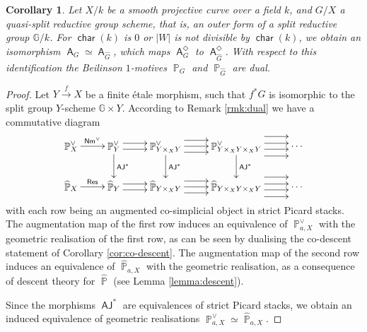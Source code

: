 \documentclass{article}
\DeclareMathOperator{\A}{\mathsf{A}}
\newcommand{\Gb}{\mathbb{G}}
\DeclareMathOperator{\Pb}{\mathbb{P}}
\DeclareMathOperator{\Res}{\mathsf{Res}}
\DeclareMathOperator{\Nm}{\mathsf{Nm}}
\DeclareMathOperator{\charac}{\mathsf{char}}
\DeclareMathOperator{\AJ}{\mathsf{AJ}}
\theoremstyle{definition}
\theoremstyle{plain}
\newtheorem{corollary}[definition]{Corollary}
\begin{document}
\begin{corollary}\label{cor:duality}
Let $X/k$ be a smooth projective curve over a field $k$, and $G/X$ a quasi-split reductive group scheme, that is, an outer form of a split reductive group $\Gb/k$. For $\charac(k)$ is $0$ or $|W|$ is not divisible by $\charac(k)$, we obtain an isomorphism $\A_{G} \simeq \A_{\widehat{G}}$, which maps $\A_{G}^{\Diamond}$ to $\A_{\widehat{G}}^{\Diamond}$. With respect to this identification the Beilinson $1$-motives $\Pb_{G}$ and $\Pb_{\widehat{G}}$ are dual.
\end{corollary}

\begin{proof}
Let $Y \xrightarrow{f} X$ be a finite \'etale morphism, such that $f^*G$ is isomorphic to the split group $Y$-scheme $\Gb \times Y$. According to Remark \ref{rmk:dual} we have a commutative diagram
\[
\xymatrix{
\Pb_{X}^{\vee} \ar[r]^{\Nm^{\vee}} & \Pb_{Y}^{\vee} \ar[d]^{\AJ^*} \ar@<-0.7ex>[r] \ar@<0.7ex>[r] & \Pb_{Y\times_X Y}^{\vee} \ar[d]^{\AJ^*} \ar@<-1.4ex>[r] \ar[r] \ar@<1.4ex>[r] & \Pb_{Y \times_X Y \times_X Y}^{\vee} \ar[d]^{\AJ^*} \ar@<-0.7ex>[r] \ar@<0.7ex>[r]  \ar@<-2.3ex>[r] \ar@<2.3ex>[r] & \cdots \\
\widehat{\Pb}_{X} \ar[r]^{\Res} & \widehat{\Pb}_{Y} \ar@<-0.7ex>[r] \ar@<0.7ex>[r] & \widehat{\Pb}_{Y \times_X Y} \ar@<-1.4ex>[r] \ar[r] \ar@<1.4ex>[r] & \widehat{\Pb}_{Y \times_X Y \times_X Y} \ar@<-0.7ex>[r] \ar@<0.7ex>[r]  \ar@<-2.3ex>[r] \ar@<2.3ex>[r] & \cdots
}
\]
with each row being an augmented co-simplicial object in strict Picard stacks. The augmentation map of the first row induces an equivalence of $\Pb_{a,X}^{\vee}$ with the geometric realisation of the first row, as can be seen by dualising the co-descent statement of Corollary \ref{cor:co-descent}. The augmentation map of the second row induces an equivalence of $\widehat{\Pb}_{a,X}$ with the geometric realisation, as a consequence of descent theory for $\widehat{\Pb}$ (see Lemma \ref{lemma:descent}).

Since the morphisms $\AJ^*$ are equivalences of strict Picard stacks, we obtain an induced equivalence of geometric realisations $\Pb_{a,X}^{\vee} \simeq \widehat{\Pb}_{a,X}$. 
\end{proof}





\end{document}
